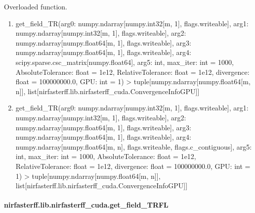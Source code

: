 \documentclass[letterpaper,10pt,english]{sphinxmanual}
\begin{document}
\begin{fulllineitems}
\label{\detokenize{_autosummary/nirfasterff.lib.nirfasterff_cuda.get_field_TR:nirfasterff.lib.nirfasterff_cuda.get_field_TR}}
\pysigstartsignatures
\pysiglinewithargsret
{}
{\sphinxparamcomma {}}
{}
\pysigstopsignatures
\sphinxAtStartPar
Overloaded function.
\begin{enumerate}
%
\item {} 
\sphinxAtStartPar
get\_field\_TR(arg0: numpy.ndarray{[}numpy.int32{[}m, 1{]}, flags.writeable{]}, arg1: numpy.ndarray{[}numpy.int32{[}m, 1{]}, flags.writeable{]}, arg2: numpy.ndarray{[}numpy.float64{[}m, 1{]}, flags.writeable{]}, arg3: numpy.ndarray{[}numpy.float64{[}m, 1{]}, flags.writeable{]}, arg4: scipy.sparse.csc\_matrix{[}numpy.float64{]}, arg5: int, max\_iter: int = 1000, AbsoluteTolerance: float = 1e\sphinxhyphen{}12, RelativeTolerance: float = 1e\sphinxhyphen{}12, divergence: float = 100000000.0, GPU: int = \sphinxhyphen{}1) \sphinxhyphen{}\textgreater{} tuple{[}numpy.ndarray{[}numpy.float64{[}m, n{]}{]}, list{[}nirfasterff.lib.nirfasterff\_cuda.ConvergenceInfoGPU{]}{]}

\item {} 
\sphinxAtStartPar
get\_field\_TR(arg0: numpy.ndarray{[}numpy.int32{[}m, 1{]}, flags.writeable{]}, arg1: numpy.ndarray{[}numpy.int32{[}m, 1{]}, flags.writeable{]}, arg2: numpy.ndarray{[}numpy.float64{[}m, 1{]}, flags.writeable{]}, arg3: numpy.ndarray{[}numpy.float64{[}m, 1{]}, flags.writeable{]}, arg4: numpy.ndarray{[}numpy.float64{[}m, n{]}, flags.writeable, flags.c\_contiguous{]}, arg5: int, max\_iter: int = 1000, AbsoluteTolerance: float = 1e\sphinxhyphen{}12, RelativeTolerance: float = 1e\sphinxhyphen{}12, divergence: float = 100000000.0, GPU: int = \sphinxhyphen{}1) \sphinxhyphen{}\textgreater{} tuple{[}numpy.ndarray{[}numpy.float64{[}m, n{]}{]}, list{[}nirfasterff.lib.nirfasterff\_cuda.ConvergenceInfoGPU{]}{]}

\end{enumerate}

\end{fulllineitems}


\sphinxstepscope


\paragraph{nirfasterff.lib.nirfasterff\_cuda.get\_field\_TRFL}
\label{\detokenize{_autosummary/nirfasterff.lib.nirfasterff_cuda.get_field_TRFL:nirfasterff-lib-nirfasterff-cuda-get-field-trfl}}\label{\detokenize{_autosummary/nirfasterff.lib.nirfasterff_cuda.get_field_TRFL::doc}}
\end{document}

